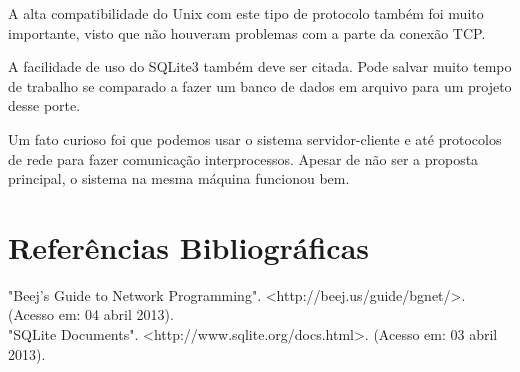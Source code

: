 \documentclass[10pt,a4paper]{report}
\begin{document}
A alta compatibilidade do Unix com este tipo de protocolo também foi muito importante, visto que não houveram problemas com a parte da conexão TCP.

A facilidade de uso do SQLite3 também deve ser citada. Pode salvar muito tempo de trabalho se comparado a fazer um banco de dados em arquivo para um projeto desse porte.

Um fato curioso foi que podemos usar o sistema servidor-cliente e até protocolos de rede para fazer comunicação interprocessos. Apesar de não ser a proposta principal, o sistema na mesma máquina funcionou bem.

\chapter{Referências Bibliográficas}
"Beej's Guide to Network Programming". <http://beej.us/guide/bgnet/>. (Acesso em: 04 abril 2013). \\
"SQLite Documents". <http://www.sqlite.org/docs.html>. (Acesso em: 03 abril 2013).
\end{document}
